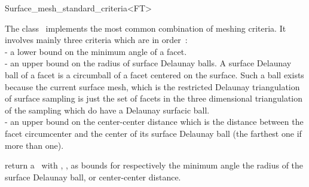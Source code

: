 

\begin{ccRefClass}{Surface_mesh_standard_criteria<FT>}  %


\ccDefinition
  
The class \ccRefName\  implements  the most common combination
of meshing criteria. It involves mainly three criteria which are
in order~: \\
- a lower bound on the minimum angle of a facet. \\
- an upper bound on the radius of surface Delaunay balls.
 A surface Delaunay ball of a facet is a circumball of a
facet  centered on the surface. Such a ball exists because the
current surface mesh, 
which is  the restricted Delaunay triangulation of surface sampling
is just the set of facets in the three dimensional triangulation of
the sampling  which do have a Delaunay surfacic ball. \\
- an upper bound on the center-center  distance 
which is the distance between the facet circumcenter and the 
 center of its  surface Delaunay ball (the farthest one if more
than one).



\ccIsModel


\ccTypes


\ccCreation
{}  %

{return a \ccRefName\ with , ,
 as bounds for respectively the minimum angle
the radius of the surface Delaunay ball, or center-center distance.}



\end{ccRefClass}
